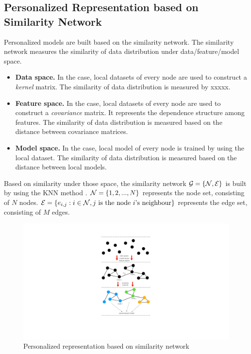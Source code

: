 \documentclass[journal]{IEEEtran}
\begin{document}
\subsection{Personalized Representation based on Similarity Network}

Personalized models are built based on the similarity network. The similarity network measures the similarity of data distribution under data/feature/model space.  
\begin{itemize}
\item \textbf{Data space.} In the case, local datasets of every node are used to construct a \textit{kernel} matrix. The similarity of data distribution is measured by xxxxx.
\item \textbf{Feature space.} In the case, local datasets of every node are used to construct a \textit{covariance} matrix. It represents the dependence structure among features. The similarity of data distribution is measured based on the distance between covariance matrices.
\item \textbf{Model space.} In the case, local model of every node is trained by using the local dataset. The similarity of data distribution is measured based on the distance between local models.
\end{itemize}

Based on similarity under those space, the similarity network ${\mathcal{G}} = \{{\mathcal{N}}, {\mathcal{E}}\}$ is built by using the KNN method \cite{dd}. ${\mathcal{N}}=\{1,2, ..., N\}$ represents the node set, consisting of $N$ nodes. ${\mathcal{E}}=\{e_{i,j} : i\in{\mathcal{N}}, j {~} \text{is the node $i$'s neighbour}\}$ represents the edge set, consisting of $M$ edges. 

\begin{figure}[!t]
\setlength{\abovecaptionskip}{0pt}
\setlength{\belowcaptionskip}{0pt}
\centering 
\includegraphics[width=0.97\columnwidth]{figs/figs_networkG}
\caption{Personalized representation based on similarity network}
\label{figure_xxx}
\end{figure}
\end{document}
